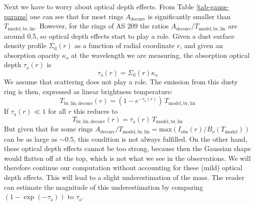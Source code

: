 \documentclass{aa}
\begin{document}
Next we have to worry about optical depth effects. From Table
\ref{tab-gauss-params} one can see that for most rings 
$A_{\mathrm{deconv}}$ is significantly smaller than $T_{\mathrm{model,br,lin}}$.
However, for the rings of AS 209 the ratios
$A_{\mathrm{deconv}}/T_{\mathrm{model,br,lin}}$ are around 0.5, so optical depth
effects start to play a role. Given a dust surface density profile
$\Sigma_{\mathrm{d}}(r)$ as a function of radial coordinate $r$, and
given an absorption opacity $\kappa_{\mathrm{a}}$ at the wavelength we
are measuring, the absorption optical depth $\tau_{\mathrm{a}}(r)$ is
\begin{equation}\label{eq-tau-afo-sig-kap}
\tau_{\mathrm{a}}(r) = \Sigma_{\mathrm{d}}(r)\kappa_{\mathrm{a}}
\end{equation}
We assume that scattering does not play a role. The emission from this
dusty ring is then, expressed as linear brightness temperature:
\begin{equation}
T_{\mathrm{br,lin,deconv}}(r) = \left(1-e^{-\tau_{\mathrm{a}}(r)}\right)\,T_{\mathrm{model,br,lin}}
\end{equation}
If $\tau_{\mathrm{a}}(r)\ll 1$ for all $r$ this reduces to
\begin{equation}\label{eq-int-afo-tau-bnu}
T_{\mathrm{br,lin,deconv}}(r) = \tau_{\mathrm{a}}(r)\,T_{\mathrm{model,br,lin}}
\end{equation}
But given that for some rings $A_{\mathrm{deconv}}/T_{\mathrm{model,br,lin}}
=\mathrm{max}(I_{\mathrm{obs}}(r)/B_\nu(T_{\mathrm{model}}))$ can be as large as
$\sim 0.5$, this condition is not always fulfilled.  On the other hand, these
optical depth effects cannot be too strong, because then the Gaussian shape
would flatten off at the top, which is not what we see in the observations. We
will therefore continue our computation without accounting for these (mild)
optical depth effects. This will lead to a slight underestimation of the
mass. The reader can estimate the magnitude of this underestimation by comparing
$(1-\exp(-\tau_{\mathrm{a}}))$ to $\tau_{\mathrm{a}}$.
\end{document}
